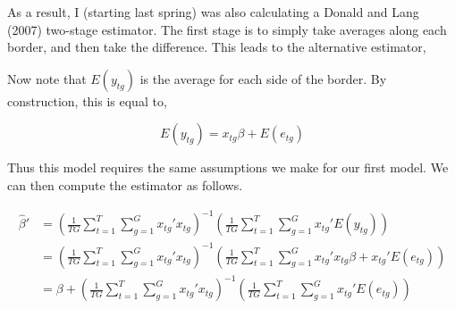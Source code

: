 \documentclass{article}
\begin{document}
As a result, I (starting last spring) was also calculating a Donald and Lang (2007) two-stage estimator. The first stage is to simply take averages along each border, and then take the difference. This leads to the alternative estimator,

Now note that $E(y_{tg})$ is the average for each side of the border. By construction, this is equal to,

$$E(y_{tg}) = x_{tg}\beta+E(e_{tg})$$

Thus this model requires the same assumptions we make for our first model. We can then compute the estimator as follows.

\begin{align*}\hat \beta' &= (\frac{1}{TG}\sum_{t=1}^{T}\sum_{g=1}^{G}x_{tg}'x_{tg})^{-1}(\frac{1}{TG}\sum_{t=1}^{T}\sum_{g=1}^{G}x_{tg}'E(y_{tg})) \\ 
&= (\frac{1}{TG}\sum_{t=1}^{T}\sum_{g=1}^{G}x_{tg}'x_{tg})^{-1}(\frac{1}{TG}\sum_{t=1}^{T}\sum_{g=1}^{G}x_{tg}' x_{tg}\beta+x_{tg}'E(e_{tg})) \\
&= \beta + (\frac{1}{TG}\sum_{t=1}^{T}\sum_{g=1}^{G}x_{tg}'x_{tg})^{-1}(\frac{1}{TG}\sum_{t=1}^{T}\sum_{g=1}^{G}x_{tg}'E(e_{tg})) \end{align*}
\end{document}
